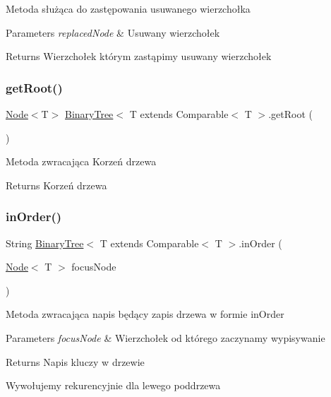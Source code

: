 Metoda służąca do zastępowania usuwanego wierzchołka 
\begin{DoxyParams}{Parameters}
{\em replaced\+Node} & Usuwany wierzchołek \\
\hline
\end{DoxyParams}
\begin{DoxyReturn}{Returns}
Wierzchołek którym zastąpimy usuwany wierzchołek 
\end{DoxyReturn}
\mbox{\label{classBinaryTree_a418ad03908efabbf2e7d271810bba07c}} 
\subsubsection{\texorpdfstring{get\+Root()}{getRoot()}}
{\footnotesize\ttfamily \hyperlink{classNode}{Node}$<$T$>$ \hyperlink{classBinaryTree}{Binary\+Tree}$<$ T extends Comparable$<$ T $>$.get\+Root (\begin{DoxyParamCaption}{ }\end{DoxyParamCaption})\hspace{0.3cm}{\ttfamily [inline]}}

Metoda zwracająca Korzeń drzewa \begin{DoxyReturn}{Returns}
Korzeń drzewa 
\end{DoxyReturn}
\mbox{\label{classBinaryTree_a77eb76ed2fa0ca744cafc1863ca37903}} 
\subsubsection{\texorpdfstring{in\+Order()}{inOrder()}}
{\footnotesize\ttfamily String \hyperlink{classBinaryTree}{Binary\+Tree}$<$ T extends Comparable$<$ T $>$.in\+Order (\begin{DoxyParamCaption}\item[{\hyperlink{classNode}{Node}$<$ T $>$}]{focus\+Node }\end{DoxyParamCaption})\hspace{0.3cm}{\ttfamily [inline]}}

Metoda zwracająca napis będący zapis drzewa w formie in\+Order 
\begin{DoxyParams}{Parameters}
{\em focus\+Node} & Wierzchołek od którego zaczynamy wypisywanie \\
\hline
\end{DoxyParams}
\begin{DoxyReturn}{Returns}
Napis kluczy w drzewie 
\end{DoxyReturn}
Wywołujemy rekurencyjnie dla lewego poddrzewa

